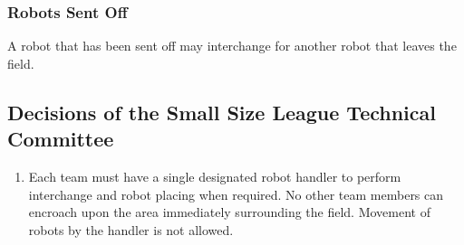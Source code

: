 \subsubsection{Robots Sent Off}
A robot that has been sent off may interchange for another robot that leaves the field.

\subsection*{Decisions of the Small Size League Technical Committee}
\begin{enumerate}
\item
Each team must have a single designated robot handler to perform interchange and robot placing when required.
No other team members can encroach upon the area immediately surrounding the field.
Movement of robots by the handler is not allowed.
\end{enumerate}
